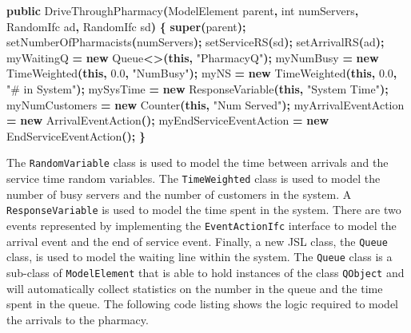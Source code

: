 \documentclass[
]{book}
\newenvironment{Shaded}{\begin{snugshade}}{\end{snugshade}}
\newcommand{\BuiltInTok}[1]{#1}
\newcommand{\DataTypeTok}[1]{\textcolor[rgb]{0.13,0.29,0.53}{#1}}
\newcommand{\FloatTok}[1]{\textcolor[rgb]{0.00,0.00,0.81}{#1}}
\newcommand{\FunctionTok}[1]{\textcolor[rgb]{0.00,0.00,0.00}{#1}}
\newcommand{\KeywordTok}[1]{\textcolor[rgb]{0.13,0.29,0.53}{\textbf{#1}}}
\newcommand{\NormalTok}[1]{#1}
\newcommand{\OperatorTok}[1]{\textcolor[rgb]{0.81,0.36,0.00}{\textbf{#1}}}
\newcommand{\StringTok}[1]{\textcolor[rgb]{0.31,0.60,0.02}{#1}}
\theoremstyle{definition}
\theoremstyle{definition}
\theoremstyle{definition}
\theoremstyle{definition}
\theoremstyle{remark}
\begin{document}
\begin{Shaded}
\begin{Highlighting}[]
    \KeywordTok{public} \FunctionTok{DriveThroughPharmacy}\OperatorTok{(}\NormalTok{ModelElement parent}\OperatorTok{,} \DataTypeTok{int}\NormalTok{ numServers}\OperatorTok{,}\NormalTok{ RandomIfc ad}\OperatorTok{,}\NormalTok{ RandomIfc sd}\OperatorTok{)} \OperatorTok{\{}
        \KeywordTok{super}\OperatorTok{(}\NormalTok{parent}\OperatorTok{);}
        \FunctionTok{setNumberOfPharmacists}\OperatorTok{(}\NormalTok{numServers}\OperatorTok{);}
        \FunctionTok{setServiceRS}\OperatorTok{(}\NormalTok{sd}\OperatorTok{);}
        \FunctionTok{setArrivalRS}\OperatorTok{(}\NormalTok{ad}\OperatorTok{);}
\NormalTok{        myWaitingQ }\OperatorTok{=} \KeywordTok{new} \BuiltInTok{Queue}\OperatorTok{\textless{}\textgreater{}(}\KeywordTok{this}\OperatorTok{,} \StringTok{"PharmacyQ"}\OperatorTok{);}
\NormalTok{        myNumBusy }\OperatorTok{=} \KeywordTok{new} \FunctionTok{TimeWeighted}\OperatorTok{(}\KeywordTok{this}\OperatorTok{,} \FloatTok{0.0}\OperatorTok{,} \StringTok{"NumBusy"}\OperatorTok{);}
\NormalTok{        myNS }\OperatorTok{=} \KeywordTok{new} \FunctionTok{TimeWeighted}\OperatorTok{(}\KeywordTok{this}\OperatorTok{,} \FloatTok{0.0}\OperatorTok{,} \StringTok{"\# in System"}\OperatorTok{);}
\NormalTok{        mySysTime }\OperatorTok{=} \KeywordTok{new} \FunctionTok{ResponseVariable}\OperatorTok{(}\KeywordTok{this}\OperatorTok{,} \StringTok{"System Time"}\OperatorTok{);}
\NormalTok{        myNumCustomers }\OperatorTok{=} \KeywordTok{new} \FunctionTok{Counter}\OperatorTok{(}\KeywordTok{this}\OperatorTok{,} \StringTok{"Num Served"}\OperatorTok{);}
\NormalTok{        myArrivalEventAction }\OperatorTok{=} \KeywordTok{new} \FunctionTok{ArrivalEventAction}\OperatorTok{();}
\NormalTok{        myEndServiceEventAction }\OperatorTok{=} \KeywordTok{new} \FunctionTok{EndServiceEventAction}\OperatorTok{();}
    \OperatorTok{\}}
\end{Highlighting}
\end{Shaded}

The \texttt{RandomVariable} class is used to model the time between
arrivals and the service time random variables. The \texttt{TimeWeighted} class
is used to model the number of busy servers and the number of customers
in the system. A \texttt{ResponseVariable} is used to model the time spent in the
system. There are two events represented by implementing the
\texttt{EventActionIfc} interface to model the arrival event and the end of
service event. Finally, a new JSL class, the \texttt{Queue} class, is used to
model the waiting line within the system. The \texttt{Queue} class is a sub-class
of \texttt{ModelElement} that is able to hold instances of the class \texttt{QObject} and
will automatically collect statistics on the number in the queue and the
time spent in the queue. The following code listing shows the logic required to model the
arrivals to the pharmacy.
\end{document}
